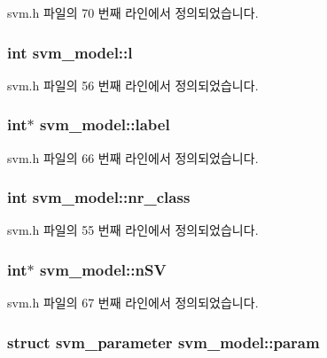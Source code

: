 svm.\+h 파일의 70 번째 라인에서 정의되었습니다.

\hypertarget{structsvm__model_ab858d7eed0bd3cc4c33c094872643d0a}{
\subsubsection[{l}]{\setlength{\rightskip}{0pt plus 5cm}int svm\+\_\+model\+::l}}\label{structsvm__model_ab858d7eed0bd3cc4c33c094872643d0a}


svm.\+h 파일의 56 번째 라인에서 정의되었습니다.

\hypertarget{structsvm__model_ac66d192809e92b95875bdf8ebb749060}{
\subsubsection[{label}]{\setlength{\rightskip}{0pt plus 5cm}int$\ast$ svm\+\_\+model\+::label}}\label{structsvm__model_ac66d192809e92b95875bdf8ebb749060}


svm.\+h 파일의 66 번째 라인에서 정의되었습니다.

\hypertarget{structsvm__model_a5af6e0cfb063e8aac03c99aa9d319116}{
\subsubsection[{nr\+\_\+class}]{\setlength{\rightskip}{0pt plus 5cm}int svm\+\_\+model\+::nr\+\_\+class}}\label{structsvm__model_a5af6e0cfb063e8aac03c99aa9d319116}


svm.\+h 파일의 55 번째 라인에서 정의되었습니다.

\hypertarget{structsvm__model_a1d342c9b9e5e4a6377862e13123a25ef}{
\subsubsection[{n\+S\+V}]{\setlength{\rightskip}{0pt plus 5cm}int$\ast$ svm\+\_\+model\+::n\+S\+V}}\label{structsvm__model_a1d342c9b9e5e4a6377862e13123a25ef}


svm.\+h 파일의 67 번째 라인에서 정의되었습니다.

\hypertarget{structsvm__model_a95f43f398a173e63d0ce26911d0a9273}{
\subsubsection[{param}]{\setlength{\rightskip}{0pt plus 5cm}struct {\bf svm\+\_\+parameter} svm\+\_\+model\+::param}}\label{structsvm__model_a95f43f398a173e63d0ce26911d0a9273}


